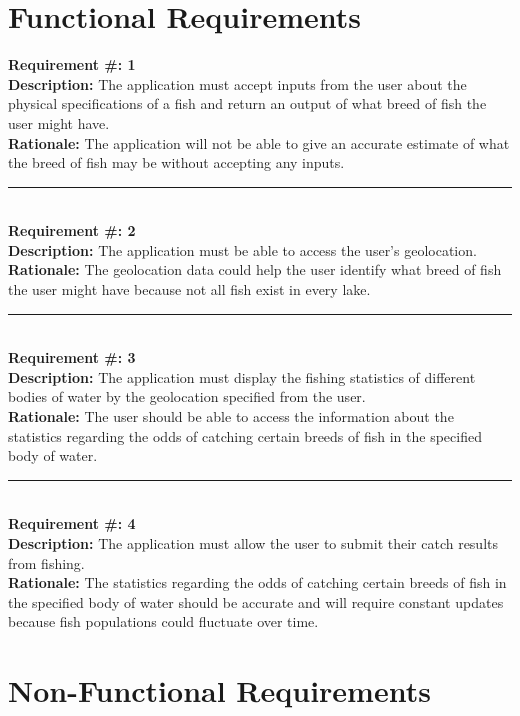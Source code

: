 \documentclass{article}
\begin{document}
\section{Functional Requirements}
	\textbf{Requirement \#: 1}\\
	\textbf{Description:} The application must accept inputs from the user about the physical specifications of a fish and return an output of what breed of fish the user might have.\\
	\textbf{Rationale: } The application will not be able to give an accurate estimate of what the breed of fish may be without accepting any inputs.

	\noindent\rule{12cm}{0.4pt} \\

	\noindent\textbf{Requirement \#: 2}\\
	\textbf{Description:} The application must be able to access the user's geolocation.\\
	\textbf{Rationale:} The geolocation data could help the user identify what breed of fish the user might have because not all fish exist in every lake.\\

	\noindent\rule{12cm}{0.4pt} \\

	\noindent\textbf{Requirement \#: 3}\\
	\textbf{Description:} The application must display the fishing statistics of different bodies of water by the geolocation specified from the user.\\
	\textbf{Rationale:} The user should be able to access the information about the statistics regarding the odds of catching certain breeds of fish in the specified body of water. \\

	\noindent\rule{12cm}{0.4pt} \\

	\noindent\textbf{Requirement \#: 4}\\
	\textbf{Description:} The application must allow the user to submit their catch results from fishing.\\
	\textbf{Rationale:} The statistics regarding the odds of catching certain breeds of fish in the specified body of water should be accurate and will require constant updates because fish populations could fluctuate over time. \\


\section{Non-Functional Requirements}
\end{document}
